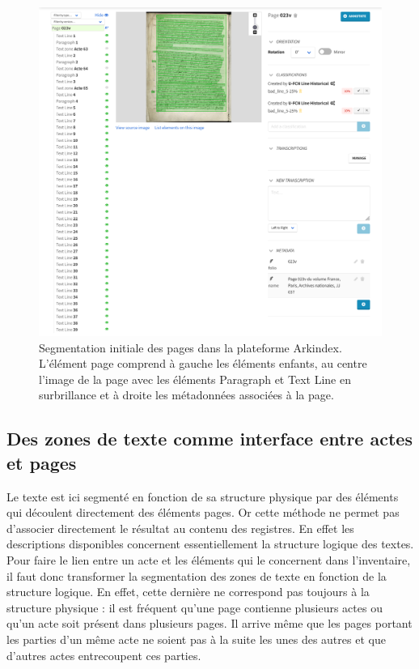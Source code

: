 \documentclass[a4paper,12pt,twoside]{book}
\begin{document}
	\begin{figure}
		\centering
		\includegraphics[width=\textwidth]{Images/Interface_Arkindex.png}
		\caption{Segmentation initiale des pages dans la plateforme Arkindex. L'élément page comprend à gauche les éléments enfants, au centre l'image de la page avec les éléments \og Paragraph\fg{} et \og Text Line\fg{} en surbrillance et à droite les métadonnées associées à la page.}
		\label{Page_Initiale_Arkindex}
	\end{figure}
	
	
	\subsection{Des zones de texte comme interface entre actes et pages}
	
	Le texte est ici segmenté en fonction de sa structure physique par des éléments qui découlent directement des éléments pages. Or cette méthode ne permet pas d'associer directement le résultat au contenu des registres. En effet les descriptions disponibles concernent essentiellement la structure logique des textes. Pour faire le lien entre un acte et les éléments qui le concernent dans l'inventaire, il faut donc transformer la segmentation des zones de texte en fonction de la structure logique. En effet, cette dernière ne correspond pas toujours à la structure physique : il est fréquent qu'une page contienne plusieurs actes ou qu'un acte soit présent dans plusieurs pages. Il arrive même que les pages portant les parties d'un même acte ne soient pas à la suite les unes des autres et que d'autres actes entrecoupent ces parties.
	
\end{document}
